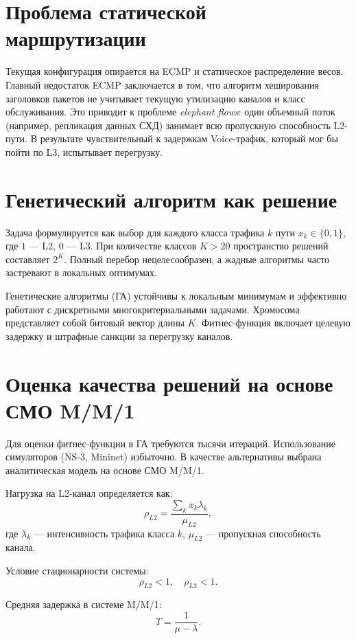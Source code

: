 \documentclass[10pt,twocolumn,a4paper]{article}
\begin{document}
\section{Проблема статической маршрутизации}
Текущая конфигурация опирается на ECMP и статическое распределение весов. Главный недостаток ECMP заключается в том, что алгоритм хеширования заголовков пакетов не учитывает текущую утилизацию каналов и класс обслуживания. Это приводит к проблеме \textit{elephant flows}: один объемный поток (например, репликация данных СХД) занимает всю пропускную способность L2-пути. В результате чувствительный к задержкам Voice-трафик, который мог бы пойти по L3, испытывает перегрузку.

\section{Генетический алгоритм как решение}
Задача формулируется как выбор для каждого класса трафика \(k\) пути \(x_k \in \{0, 1\}\), где \(1\) — L2, \(0\) — L3. При количестве классов \(K > 20\) пространство решений составляет \(2^K\). Полный перебор нецелесообразен, а жадные алгоритмы часто застревают в локальных оптимумах. 

Генетические алгоритмы (ГА) устойчивы к локальным минимумам и эффективно работают с дискретными многокритериальными задачами. Хромосома представляет собой битовый вектор длины \(K\). Фитнес-функция включает целевую задержку и штрафные санкции за перегрузку каналов.

\section{Оценка качества решений на основе СМО M/M/1}
Для оценки фитнес-функции в ГА требуются тысячи итераций. Использование симуляторов (NS-3, Mininet) избыточно. В качестве альтернативы выбрана аналитическая модель на основе СМО M/M/1.

Нагрузка на L2-канал определяется как:
\begin{equation}
\rho_{L2} = \frac{\sum_k x_k \lambda_k}{\mu_{L2}},
\end{equation}
где \(\lambda_k\) — интенсивность трафика класса \(k\), \(\mu_{L2}\) — пропускная способность канала.

Условие стационарности системы:
\begin{equation}
\rho_{L2} < 1, \quad \rho_{L3} < 1.
\end{equation}

Средняя задержка в системе M/M/1:
\begin{equation}
T = \frac{1}{\mu - \lambda}.
\end{equation}
\end{document}
